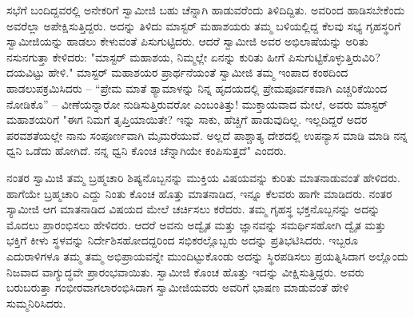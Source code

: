 ಸಭೆಗೆ ಬಂದಿದ್ದವರಲ್ಲಿ ಅನೇಕರಿಗೆ ಸ್ವಾಮೀಜಿ ಬಹು ಚೆನ್ನಾಗಿ ಹಾಡುವರೆಂದು ತಿಳಿದಿದ್ದಿತು. ಅವರಿಂದ ಹಾಡಿಸಬೇಕೆಂದು ಅವರೆಲ್ಲಾ ಅಪೇಕ್ಷಿಸುತ್ತಿದ್ದರು. ಅದನ್ನು ತಿಳಿದು ಮಾಸ್ಟರ್ ಮಹಾಶಯರು ತಮ್ಮ ಬಳಿಯಲ್ಲಿದ್ದ ಕೆಲವು ಸಭ್ಯ ಗೃಹಸ್ಥರಿಗೆ ಸ್ವಾಮೀಜಿಯನ್ನು ಹಾಡಲು ಕೇಳುವಂತೆ ಪಿಸುಗುಟ್ಟಿದರು. ಆದರೆ ಸ್ವಾಮೀಜಿ ಅವರ ಅಭಿಲಾಷೆಯನ್ನು ಅರಿತು ನಸುನಗುತ್ತಾ ಕೇಳಿದರು: "ಮಾಸ್ಟರ್ ಮಹಾಶಯ, ನಿಮ್ಮಲ್ಲೇ ಏನನ್ನು ಕುರಿತು ಹೀಗೆ ಪಿಸುಗುಟ್ಟಿಕೊಳ್ಳುತ್ತಿರುವಿರಿ? ದಯವಿಟ್ಟು ಹೇಳಿ." ಮಾಸ್ಟರ್ ಮಹಾಶಯರ ಪ್ರಾರ್ಥನೆಯಂತೆ ಸ್ವಾಮೀಜಿ ತಮ್ಮ ಇಂಪಾದ ಕಂಠದಿಂದ ಹಾಡಲುಪಕ್ರಮಿಸಿದರು – “ಪ್ರೇಮ ಮಾತೆ ಶ್ಯಾಮಾಳನ್ನು ನಿನ್ನ ಹೃದಯದಲ್ಲಿ ಪ್ರೇಮಪೂರ್ವಕವಾಗಿ ಎಚ್ಚರಿಕೆಯಿಂದ ನೋಡಿಕೊ” – ವೀಣೆಯನ್ನಾರೋ ನುಡಿಸುತ್ತಿರುವರೋ ಎಂಬಂತಿತ್ತು! ಮುಕ್ತಾಯವಾದ ಮೇಲೆ, ಅವರು ಮಾಸ್ಟರ್ ಮಹಾಶಯರಿಗೆ "ಈಗ ನಿಮಗೆ ತೃಪ್ತಿಯಾಯಿತೇ? ಇನ್ನು ಸಾಕು, ಹೆಚ್ಚಿಗೆ ಹಾಡುವುದಿಲ್ಲ. ಇಲ್ಲದಿದ್ದರೆ ಅದರ ಪರವಶತೆಯಲ್ಲೇ ನಾನು ಸಂಪೂರ್ಣವಾಗಿ ಮೈಮರೆಯುವೆ. ಅಲ್ಲದೆ ಪಾಶ್ಚಾತ್ಯ ದೇಶದಲ್ಲಿ ಉಪನ್ಯಾಸ ಮಾಡಿ ಮಾಡಿ ನನ್ನ ಧ್ವನಿ ಒಡೆದು ಹೋಗಿದೆ. ನನ್ನ ಧ್ವನಿ ಕೊಂಚ ಚೆನ್ನಾಗಿಯೇ ಕಂಪಿಸುತ್ತದೆ" ಎಂದರು.

ನಂತರ ಸ್ವಾಮಿಜಿ ತಮ್ಮ ಬ್ರಹ್ಮಚಾರಿ ಶಿಷ್ಯನೊಬ್ಬನನ್ನು ಮುಕ್ತಿಯ ವಿಷಯವನ್ನು ಕುರಿತು ಮಾತನಾಡುವಂತೆ ಹೇಳಿದರು. ಹಾಗೆಯೇ ಬ್ರಹ್ಮಚಾರಿ ಎದ್ದು ನಿಂತು ಕೊಂಚ ಹೊತ್ತು ಮಾತನಾಡಿದ, ಇನ್ನೂ ಕೆಲವರು ಹಾಗೇ ಮಾಡಿದರು. ನಂತರ ಸ್ಯಾಮೀಜಿ ಆಗ ಮಾತನಾಡಿದ ವಿಷಯದ ಮೇಲೆ ಚರ್ಚಿಸಲು ಕರೆದರು. ತಮ್ಮ ಗೃಹಸ್ಥ ಭಕ್ತನೊಬ್ಬನನ್ನು ಅದನ್ನು ಮೊದಲು ಪ್ರಾರಂಭಿಸಲು ಹೇಳಿದರು. ಆದರೆ ಅವನು ಅದ್ವೈತ ಮತ್ತು ಜ್ಞಾನವನ್ನು ಸಮರ್ಥಿಸಹೋಗಿ ದ್ವೈತ ಮತ್ತು ಭಕ್ತಿಗೆ ಕೀಳು ಸ್ಥಳವನ್ನು ನಿರ್ದೇಶಿಸಹೋದದ್ದರಿಂದ ಸಭಿಕರಲ್ಲೊಬ್ಬರು ಅದನ್ನು ಪ್ರತಿಭಟಿಸಿದರು. ಇಬ್ಬರೂ ಎದುರಾಳಿಗಳೂ ತಮ್ಮ ತಮ್ಮ ಅಭಿಪ್ರಾಯವನ್ನೇ ಮುಂದಿಟ್ಟುಕೊಂಡು ಅದನ್ನು ಸ್ಥಿರಪಡಿಸಲು ಪ್ರಯತ್ನಿಸಿದಾಗ ಅಲ್ಲೊಂದು ನಿಜವಾದ ವಾಗ್ಯುದ್ಧವೇ ಪ್ರಾರಂಭವಾಯಿತು. ಸ್ವಾಮೀಜಿ ಕೊಂಚ ಹೊತ್ತು ಇದನ್ನು ವೀಕ್ಷಿಸುತ್ತಿದ್ದರು. ಅವರು ಬರುಬರುತ್ತಾ ಗಂಭೀರವಾಗಲಾರಂಭಿಸಿದಾಗ ಸ್ವಾಮೀಜಿಯವರು ಅವರಿಗೆ ಭಾಷಣ ಮಾಡುವಂತೆ ಹೇಳಿ ಸುಮ್ಮನಿರಿಸಿದರು.

